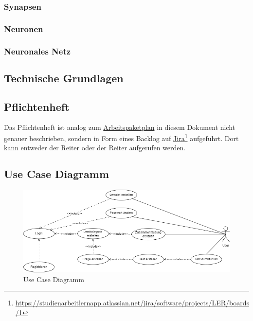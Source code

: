 \subsubsection{Synapsen}
\subsubsection{Neuronen}
\subsubsection{Neuronales Netz}
\subsection{Technische Grundlagen}

\subsection{Pflichtenheft}
Das Pflichtenheft ist analog zum
\hyperref[sec:arbeitspaketplan]{Arbeitspaketplan} in diesem Dokument nicht
genauer beschrieben, sondern in Form eines Backlog auf
\href{https://studienarbeitlernapp.atlassian.net/jira/software/projects/LER/boards/1}{\underline{Jira}}\footnote{\href{https://studienarbeitlernapp.atlassian.net/jira/software/projects/LER/boards/1}{https://studienarbeitlernapp.atlassian.net/jira/software/projects/LER/boards/1}}
aufgeführt. Dort kann entweder der Reiter  oder der Reiter
 aufgerufen werden.

\subsection{Use Case Diagramm}

\begin{figure}[H]
  \centering
  \includegraphics[width=1\textwidth]{images/diagramme/UseCase_Diagramm.png}
  \caption{Use Case Diagramm}
  \label{fig:UseCaseDiagramm}
\end{figure}
\newpage
